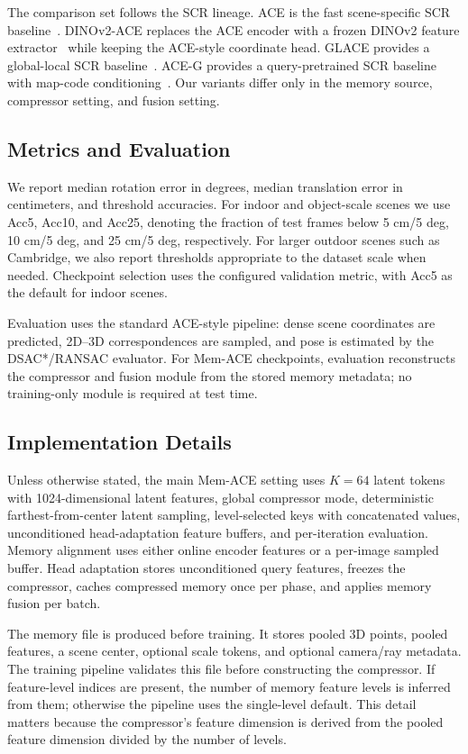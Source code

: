 \documentclass[letterpaper]{article} %
\newcommand{\shortmethod}{Mem-ACE}
\newcommand{\accfive}{Acc5}
\newcommand{\accten}{Acc10}
\newcommand{\acctwentyfive}{Acc25}
\begin{document}
The comparison set follows the SCR lineage. ACE is the fast scene-specific SCR baseline~\citep{brachmann2023ace}. DINOv2-ACE replaces the ACE encoder with a frozen DINOv2 feature extractor~\citep{oquab2023dinov2} while keeping the ACE-style coordinate head. GLACE provides a global-local SCR baseline~\citep{GLACE2024CVPR}. ACE-G provides a query-pretrained SCR baseline with map-code conditioning~\citep{bruns2025aceg}. Our variants differ only in the memory source, compressor setting, and fusion setting.

\subsection{Metrics and Evaluation}

We report median rotation error in degrees, median translation error in centimeters, and threshold accuracies. For indoor and object-scale scenes we use \accfive{}, \accten{}, and \acctwentyfive{}, denoting the fraction of test frames below 5 cm/5 deg, 10 cm/5 deg, and 25 cm/5 deg, respectively. For larger outdoor scenes such as Cambridge, we also report thresholds appropriate to the dataset scale when needed. Checkpoint selection uses the configured validation metric, with \accfive{} as the default for indoor scenes.

Evaluation uses the standard ACE-style pipeline: dense scene coordinates are predicted, 2D--3D correspondences are sampled, and pose is estimated by the DSAC*/RANSAC evaluator. For \shortmethod{} checkpoints, evaluation reconstructs the compressor and fusion module from the stored memory metadata; no training-only module is required at test time.

\subsection{Implementation Details}

Unless otherwise stated, the main \shortmethod{} setting uses $K=64$ latent tokens with 1024-dimensional latent features, global compressor mode, deterministic farthest-from-center latent sampling, level-selected keys with concatenated values, unconditioned head-adaptation feature buffers, and per-iteration evaluation. Memory alignment uses either online encoder features or a per-image sampled buffer. Head adaptation stores unconditioned query features, freezes the compressor, caches compressed memory once per phase, and applies memory fusion per batch.

The memory file is produced before training. It stores pooled 3D points, pooled features, a scene center, optional scale tokens, and optional camera/ray metadata. The training pipeline validates this file before constructing the compressor. If feature-level indices are present, the number of memory feature levels is inferred from them; otherwise the pipeline uses the single-level default. This detail matters because the compressor's feature dimension is derived from the pooled feature dimension divided by the number of levels.
\end{document}
